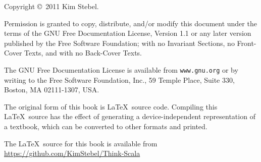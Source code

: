 \documentclass[10pt]{book}
\begin{document}
\begin{latexonly}
\begin{flushright}
\vspace{0.5in}



\vfill

\end{flushright}


\pagebreak
\thispagestyle{empty}

{\small
Copyright \copyright~2011 Kim Stebel.









\vspace{0.2in}


Permission is granted to copy, distribute, and/or modify this document
under the terms of the GNU Free Documentation License, Version 1.1 or
any later version published by the Free Software Foundation; with no
Invariant Sections, no Front-Cover Texts, and with no Back-Cover Texts.

The GNU Free Documentation License is available from {\tt www.gnu.org}
or by writing to the Free Software Foundation, Inc., 59 Temple Place,
Suite 330, Boston, MA 02111-1307, USA.

The original form of this book is \LaTeX\ source code.  Compiling this
\LaTeX\ source has the effect of generating a device-independent
representation of a textbook, which can be converted to other formats
and printed.

The \LaTeX\ source for this book is available from
\url{https://github.com/KimStebel/Think-Scala}

\vspace{0.2in}

} %

\end{latexonly}
\end{document}

